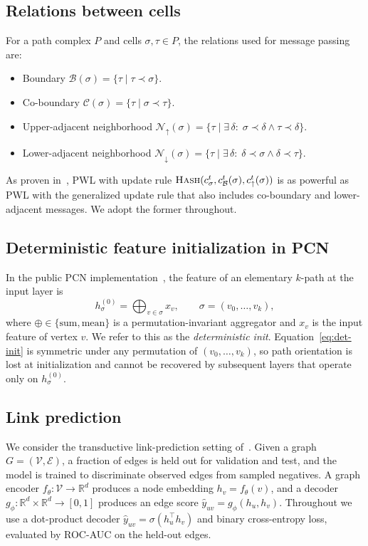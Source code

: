 \documentclass{article}
\begin{document}
\subsection{Relations between cells}
\label{subsec:relations}
For a path complex $P$ and cells $\sigma, \tau \in P$, the relations used for message passing are:
\begin{itemize}
  \item Boundary $\mathcal{B}(\sigma) = \{\tau \mid \tau \prec \sigma\}$.
  \item Co-boundary $\mathcal{C}(\sigma) = \{\tau \mid \sigma \prec \tau\}$.
  \item Upper-adjacent neighborhood $\mathcal{N}_\uparrow(\sigma) = \{\tau \mid \exists\,\delta:\; \sigma \prec \delta \wedge \tau \prec \delta\}$.
  \item Lower-adjacent neighborhood $\mathcal{N}_\downarrow(\sigma) = \{\tau \mid \exists\,\delta:\; \delta \prec \sigma \wedge \delta \prec \tau\}$.
\end{itemize}
As proven in~\citet{truong_weisfeiler_2024}, PWL with update rule $\textsc{Hash}(c_\sigma^t, c_\mathcal{B}^t(\sigma), c_\uparrow^t(\sigma))$ is as powerful as PWL with the generalized update rule that also includes co-boundary and lower-adjacent messages. We adopt the former throughout.

\subsection{Deterministic feature initialization in PCN}
\label{subsec:det-init}
In the public PCN implementation~\citep{truong_weisfeiler_2024}, the feature of an elementary $k$-path at the input layer is
\begin{equation}
  h_\sigma^{(0)} = \bigoplus_{v \in \sigma} x_v, \qquad \sigma = (v_0, \ldots, v_k), \label{eq:det-init}
\end{equation}
where $\oplus \in \{\text{sum}, \text{mean}\}$ is a permutation-invariant aggregator and $x_v$ is the input feature of vertex $v$. We refer to this as the \emph{deterministic init}. Equation~\eqref{eq:det-init} is symmetric under any permutation of $(v_0, \ldots, v_k)$, so path orientation is lost at initialization and cannot be recovered by subsequent layers that operate only on $h_\sigma^{(0)}$.

\subsection{Link prediction}
\label{subsec:lp}
We consider the transductive link-prediction setting of~\citet{kipf_variational_2016}. Given a graph $G = (\mathcal{V}, \mathcal{E})$, a fraction of edges is held out for validation and test, and the model is trained to discriminate observed edges from sampled negatives. A graph encoder $f_\theta: \mathcal{V} \to \mathbb{R}^d$ produces a node embedding $h_v = f_\theta(v)$, and a decoder $g_\phi: \mathbb{R}^d \times \mathbb{R}^d \to [0, 1]$ produces an edge score $\hat{y}_{uv} = g_\phi(h_u, h_v)$. Throughout we use a dot-product decoder $\hat{y}_{uv} = \sigma(h_u^\top h_v)$ and binary cross-entropy loss, evaluated by ROC-AUC on the held-out edges.
\end{document}
